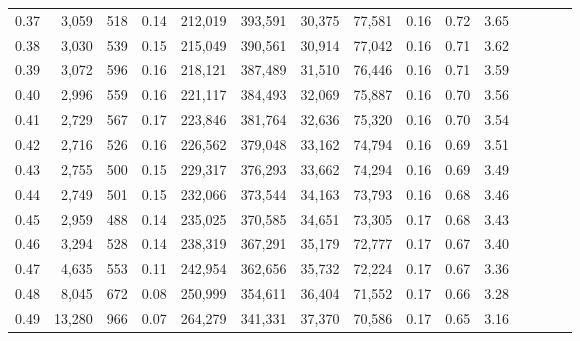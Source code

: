\begin{tabular}{rrrcrrrrrrrrrrr}
0.37 &   3,059 &     518 &                                       0.14 &  212,019 &  393,591 &   30,375 &  77,581 &  0.16 &  0.72 &                         3.65 \\
0.38 &   3,030 &     539 &                                       0.15 &  215,049 &  390,561 &   30,914 &  77,042 &  0.16 &  0.71 &                         3.62 \\
0.39 &   3,072 &     596 &                                       0.16 &  218,121 &  387,489 &   31,510 &  76,446 &  0.16 &  0.71 &                         3.59 \\
0.40 &   2,996 &     559 &                                       0.16 &  221,117 &  384,493 &   32,069 &  75,887 &  0.16 &  0.70 &                         3.56 \\
0.41 &   2,729 &     567 &                                       0.17 &  223,846 &  381,764 &   32,636 &  75,320 &  0.16 &  0.70 &                         3.54 \\
0.42 &   2,716 &     526 &                                       0.16 &  226,562 &  379,048 &   33,162 &  74,794 &  0.16 &  0.69 &                         3.51 \\
0.43 &   2,755 &     500 &                                       0.15 &  229,317 &  376,293 &   33,662 &  74,294 &  0.16 &  0.69 &                         3.49 \\
0.44 &   2,749 &     501 &                                       0.15 &  232,066 &  373,544 &   34,163 &  73,793 &  0.16 &  0.68 &                         3.46 \\
0.45 &   2,959 &     488 &                                       0.14 &  235,025 &  370,585 &   34,651 &  73,305 &  0.17 &  0.68 &                         3.43 \\
0.46 &   3,294 &     528 &                                       0.14 &  238,319 &  367,291 &   35,179 &  72,777 &  0.17 &  0.67 &                         3.40 \\
0.47 &   4,635 &     553 &                                       0.11 &  242,954 &  362,656 &   35,732 &  72,224 &  0.17 &  0.67 &                         3.36 \\
0.48 &   8,045 &     672 &                                       0.08 &  250,999 &  354,611 &   36,404 &  71,552 &  0.17 &  0.66 &                         3.28 \\
0.49 &  13,280 &     966 &                                       0.07 &  264,279 &  341,331 &   37,370 &  70,586 &  0.17 &  0.65 &                         3.16 \\

\end{tabular}
